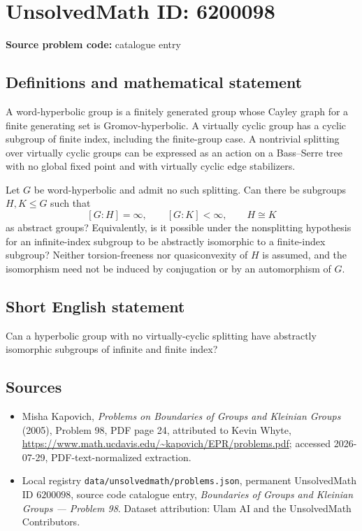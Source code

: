 \documentclass[11pt]{article}
\begin{document}
\section*{UnsolvedMath ID: 6200098}
\textbf{Source problem code:} catalogue entry
\subsection{Definitions and mathematical statement}
A word-hyperbolic group is a finitely generated group whose Cayley graph for a finite generating set is Gromov-hyperbolic. A virtually cyclic group has a cyclic subgroup of finite index, including the finite-group case. A nontrivial splitting over virtually cyclic groups can be expressed as an action on a Bass--Serre tree with no global fixed point and with virtually cyclic edge stabilizers.

Let $G$ be word-hyperbolic and admit no such splitting. Can there be subgroups $H,K\leq G$ such that
\[
[G:H]=\infty,\qquad [G:K]<\infty,\qquad H\cong K
\]
as abstract groups? Equivalently, is it possible under the nonsplitting hypothesis for an infinite-index subgroup to be abstractly isomorphic to a finite-index subgroup? Neither torsion-freeness nor quasiconvexity of $H$ is assumed, and the isomorphism need not be induced by conjugation or by an automorphism of $G$.
\subsection{Short English statement}
Can a hyperbolic group with no virtually-cyclic splitting have abstractly isomorphic subgroups of infinite and finite index?
\subsection{Sources}
\begin{itemize}
\item Misha Kapovich, \emph{Problems on Boundaries of Groups and Kleinian Groups} (2005), Problem 98, PDF page 24, attributed to Kevin Whyte, \url{https://www.math.ucdavis.edu/~kapovich/EPR/problems.pdf}; accessed 2026-07-29, PDF-text-normalized extraction.
\item Local registry \texttt{data/unsolvedmath/problems.json}, permanent UnsolvedMath ID $6200098$, source code catalogue entry, \emph{Boundaries of Groups and Kleinian Groups --- Problem 98}. Dataset attribution: Ulam AI and the UnsolvedMath Contributors.
\end{itemize}
\end{document}
